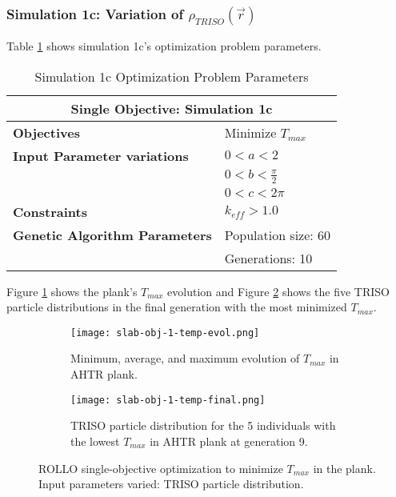 \subsubsection{Simulation 1c: Variation of $\rho_{TRISO}(\vec{r})$}
Table \ref{tab:simulation1c} shows simulation 1c's optimization problem parameters. 
\begin{table}[H]
    \centering
    \onehalfspacing
    \caption{Simulation 1c Optimization Problem Parameters}
	\label{tab:simulation1c}
    \footnotesize
    \begin{tabular}{l|p{3cm}}
    \hline 
    \multicolumn{2}{c}{\textbf{Single Objective: Simulation 1c}} \\
    \hline 
    \textbf{Objectives} & Minimize $T_{max}$ \\
    \hline 
    \textbf{Input Parameter variations} & $0<a<2$ \\
    & $0<b<\frac{\pi}{2}$ \\
    & $0<c<2\pi$ \\
    \hline
    \textbf{Constraints} & $k_{eff} > 1.0$\\ 
    \hline 
    \textbf{Genetic Algorithm Parameters} & Population size: 60 \\
    & Generations: 10 \\
    \hline
    \end{tabular}
\end{table}
Figure \ref{fig:slab-obj-1-temp-evol} shows the plank's $T_{max}$ evolution 
and Figure \ref{fig:slab-obj-1-temp-final} shows the five TRISO particle 
distributions in the final generation with the most minimized $T_{max}$.
\begin{figure}[]
    \centering
    \begin{subfigure}{\textwidth}
        \texttt{[image: slab-obj-1-temp-evol.png]}
        \caption{Minimum, average, and maximum evolution of $T_{max}$ in 
        AHTR plank.}
        \label{fig:slab-obj-1-temp-evol} 
    \end{subfigure}
    \begin{subfigure}{\textwidth}
        \texttt{[image: slab-obj-1-temp-final.png]}
        \caption{TRISO particle distribution for the 5 individuals with the 
        lowest $T_{max}$ in AHTR plank at generation 9.}
        \label{fig:slab-obj-1-temp-final} 
    \end{subfigure}
    \caption{ROLLO single-objective optimization to minimize $T_{max}$ 
    in the plank. Input parameters varied: TRISO particle distribution.}
    \label{fig:slab-obj-1-temp}
\end{figure}
